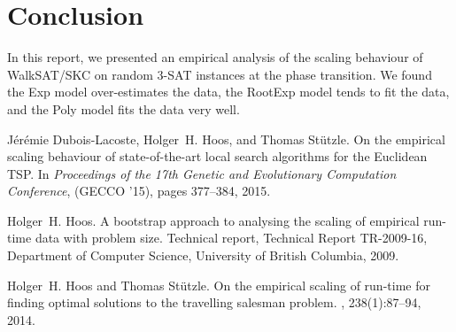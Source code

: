 \begin{table}[tb]
\noindent \begin{centering}

% 
\par\end{centering}

\caption{\label{tab:Bootstrap-intervals-challenge} 95\% bootstrap confidence intervals
for the medians of the  running time predictions and observed running times on random 3-SAT instances at the phase transition.
The instance sizes shown here are larger than those used for fitting the models.
Bootstrap intervals on predictions that are weakly consistent
with the observed data are shown in boldface
and those that are strongly consistent are marked
by asterisks ({*}).}
\end{table}


\section{Conclusion}

In this report, we presented an empirical analysis of the scaling
behaviour of WalkSAT/SKC on random 3-SAT instances at the phase transition. We found
the Exp model over-estimates the data, the RootExp model tends to fit the data, and the Poly model fits the data very well.


\begin{thebibliography}{1}

J{\'e}r{\'e}mie Dubois-Lacoste, Holger~H. Hoos, and Thomas St{\"u}tzle.
\newblock On the empirical scaling behaviour of state-of-the-art local search
algorithms for the {E}uclidean {TSP}.
\newblock In {\em Proceedings of the 17th Genetic and Evolutionary Computation Conference}, (GECCO '15), pages 377--384, 2015.

Holger~H. Hoos.
\newblock A bootstrap approach to analysing the scaling of empirical run-time
data with problem size.
\newblock Technical report, Technical Report TR-2009-16, Department of Computer Science, University of British
Columbia, 2009.

Holger~H. Hoos and Thomas St{\"u}tzle.
\newblock On the empirical scaling of run-time for finding optimal solutions to
the travelling salesman problem.
, 238(1):87--94, 2014.

\end{thebibliography}



